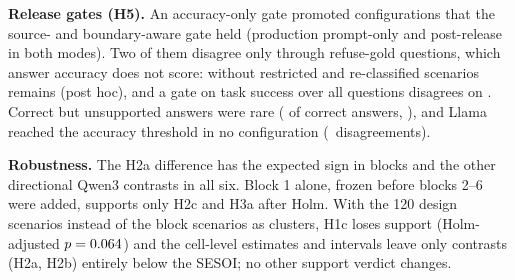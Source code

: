 \documentclass[conference,a4paper]{IEEEtran}
\begin{document}
\textbf{Release gates (H5).} An accuracy-only gate promoted \GateDisagree{} configurations that the source- and boundary-aware gate held (production prompt-only and post-release in both modes). Two of them disagree only through refuse-gold questions, which answer accuracy does not score: without restricted and re-classified scenarios \PhGateDisagreeNoProbe{} remains (post hoc), and a gate on task success over all questions disagrees on \GateDisagreeTask. Correct but unsupported answers were rare (\HFiveRate{} of correct answers, \HFiveCI), and Llama reached the accuracy threshold in no configuration (\LlamaGateDisagree{}~disagreements).

\textbf{Robustness.} The H2a difference has the expected sign in \ConHTwoAccPostreleaseAllBlocks{} blocks and the other directional Qwen3 contrasts in all six. Block 1 alone, frozen before blocks 2--6 were added, supports only H2c and H3a after Holm. With the 120 design scenarios instead of the block scenarios as clusters, H1c loses support (Holm-adjusted $p=0.064$) and the cell-level estimates and intervals leave only \PhCellNDirSmallWord{} contrasts (H2a, H2b) entirely below the SESOI; no other support verdict changes.
\end{document}

